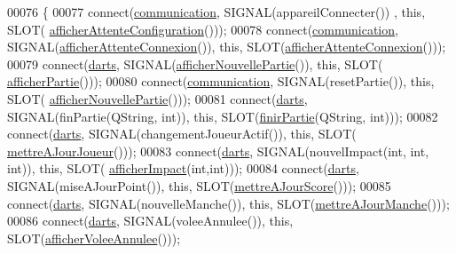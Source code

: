 \begin{DoxyCode}
00076 \{
00077     connect(\hyperlink{class_ihm_a2f3d4781795781a840786cd8c2233899}{communication}, SIGNAL(appareilConnecter()) , \textcolor{keyword}{this}, SLOT(
      \hyperlink{class_ihm_a3d1f9b366774b538acfcf66195c3c81a}{afficherAttenteConfiguration}()));
00078     connect(\hyperlink{class_ihm_a2f3d4781795781a840786cd8c2233899}{communication}, SIGNAL(\hyperlink{class_ihm_a46f511e7be2c138a8fe2dec17d6bb2bf}{afficherAttenteConnexion}()), \textcolor{keyword}{this}, 
      SLOT(\hyperlink{class_ihm_a46f511e7be2c138a8fe2dec17d6bb2bf}{afficherAttenteConnexion}()));
00079     connect(\hyperlink{class_ihm_a2a0f54d33f4d6b2531ec2190c4a2356e}{darts}, SIGNAL(\hyperlink{class_ihm_a90c6b5c75d3903f50ea7c00b8093c686}{afficherNouvellePartie}()), \textcolor{keyword}{this}, SLOT(
      \hyperlink{class_ihm_a3b26fb5299eba99925d005ea39eef9da}{afficherPartie}()));
00080     connect(\hyperlink{class_ihm_a2f3d4781795781a840786cd8c2233899}{communication}, SIGNAL(resetPartie()), \textcolor{keyword}{this}, SLOT(
      \hyperlink{class_ihm_a90c6b5c75d3903f50ea7c00b8093c686}{afficherNouvellePartie}()));
00081     connect(\hyperlink{class_ihm_a2a0f54d33f4d6b2531ec2190c4a2356e}{darts}, SIGNAL(finPartie(QString, \textcolor{keywordtype}{int})), \textcolor{keyword}{this}, SLOT(\hyperlink{class_ihm_a0c7ee6ee6313db87c7cc34dbd57dd57d}{finirPartie}(QString, \textcolor{keywordtype}{int})));
00082     connect(\hyperlink{class_ihm_a2a0f54d33f4d6b2531ec2190c4a2356e}{darts}, SIGNAL(changementJoueurActif()), \textcolor{keyword}{this}, SLOT(
      \hyperlink{class_ihm_aaeeb08a39f940e58da194768763dc00b}{mettreAJourJoueur}()));
00083     connect(\hyperlink{class_ihm_a2a0f54d33f4d6b2531ec2190c4a2356e}{darts}, SIGNAL(nouvelImpact(\textcolor{keywordtype}{int}, \textcolor{keywordtype}{int}, \textcolor{keywordtype}{int})), \textcolor{keyword}{this}, SLOT(
      \hyperlink{class_ihm_a591e686d87b027ac16e91b3b9867a58a}{afficherImpact}(\textcolor{keywordtype}{int},\textcolor{keywordtype}{int})));
00084     connect(\hyperlink{class_ihm_a2a0f54d33f4d6b2531ec2190c4a2356e}{darts}, SIGNAL(miseAJourPoint()), \textcolor{keyword}{this}, SLOT(\hyperlink{class_ihm_a238255f517506367fe8913b2dad50c65}{mettreAJourScore}()));
00085     connect(\hyperlink{class_ihm_a2a0f54d33f4d6b2531ec2190c4a2356e}{darts}, SIGNAL(nouvelleManche()), \textcolor{keyword}{this}, SLOT(\hyperlink{class_ihm_a3b41d92919b87966f903b22863dc6acb}{mettreAJourManche}()));
00086     connect(\hyperlink{class_ihm_a2a0f54d33f4d6b2531ec2190c4a2356e}{darts}, SIGNAL(voleeAnnulee()), \textcolor{keyword}{this}, SLOT(\hyperlink{class_ihm_a066192d0a1b9c241a67032b0c3c96be6}{afficherVoleeAnnulee}()));

\end{DoxyCode}
